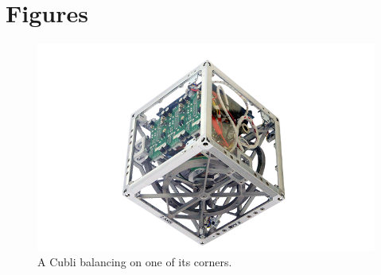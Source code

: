 \chapter{Figures}

\begin{figure}[H] 
	\centering
	\includegraphics[scale=1.3]{figures/CubliCorner-700x4302}
	\caption{A Cubli balancing on one of its corners.\cite{RAndrea}}
	\label{CubliCorner}
\end{figure}\vspace{-18pt}

